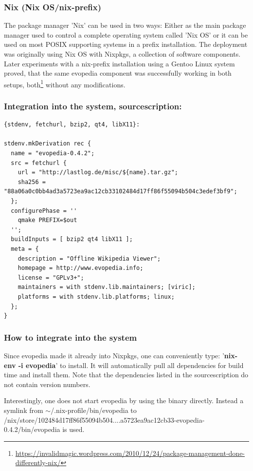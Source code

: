 \documentclass[a4paper,10pt]{article}
\begin{document}
\newpage
\subsubsection{Nix (Nix OS/nix-prefix)}
The package manager 'Nix' can be used in two ways: Either as the main package manager used to control a complete operating system called 'Nix OS' or it can be used on most POSIX supporting systems in a prefix installation. The deployment was originally using Nix OS with Nixpkgs, a collection of software components. Later experiments with a nix-prefix installation using a Gentoo Linux system proved, that the same evopedia component was successfully working in both setups, both\footnote{\url{https://invalidmagic.wordpress.com/2010/12/24/package-management-done-differently-nix/}} without any modifications.
\subsubsection*{Integration into the system, sourcescription:}
 
\begin{verbatim}
{stdenv, fetchurl, bzip2, qt4, libX11}:

stdenv.mkDerivation rec {
  name = "evopedia-0.4.2";
  src = fetchurl {
    url = "http://lastlog.de/misc/${name}.tar.gz";
    sha256 = "88a06a0c0bb4ad3a5723ea9ac12cb33102484d17ff86f55094b504c3edef3bf9";
  };
  configurePhase = ''
    qmake PREFIX=$out
  '';
  buildInputs = [ bzip2 qt4 libX11 ];
  meta = {
    description = "Offline Wikipedia Viewer";
    homepage = http://www.evopedia.info;
    license = "GPLv3+";
    maintainers = with stdenv.lib.maintainers; [viric];
    platforms = with stdenv.lib.platforms; linux;
  };
}
\end{verbatim}

\subsubsection*{How to integrate into the system}
Since evopedia made it already into Nixpkgs, one can conveniently type: '\textbf{nix-env -i evopedia}' to install. It will automatically pull all dependencies for build time and install them. Note that the dependencies listed in the sourcescription do not contain version numbers.

Interestingly, one does not start evopedia by using the binary directly. Instead a symlink from $\sim$/.nix-profile/bin/evopedia to  /nix/store/102484d17ff86f55094b504....a5723ea9ac12cb33-evopedia-0.4.2/bin/evopedia is used.
\end{document}
